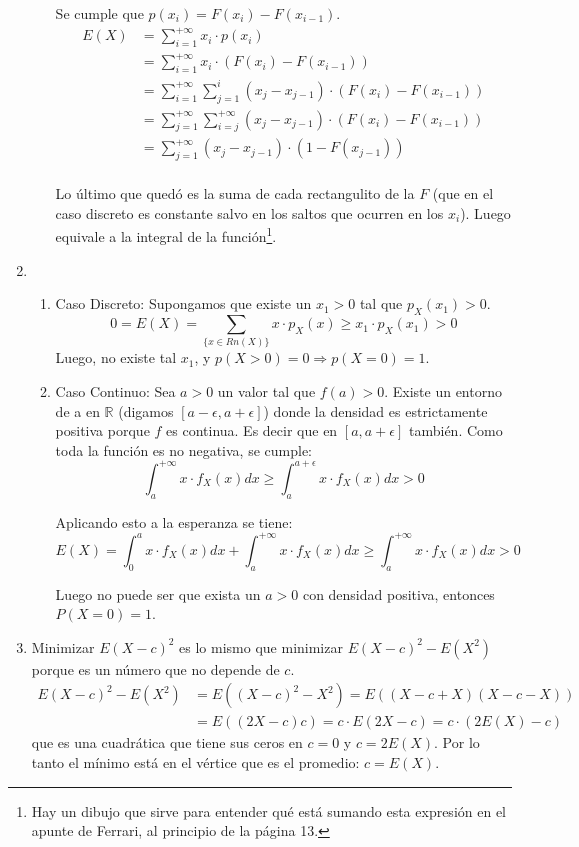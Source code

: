 \begin{enumerate}
\begin{enumerate}
				Se cumple que $p(x_i) = F(x_i) - F(x_{i-1})$.
				\begin{align*}
					E(X)	& = \sum_{i=1}^{+\infty} x_i\cdot{p(x_i)}				\\
							& = \sum_{i=1}^{+\infty} x_i\cdot(F(x_i) - F(x_{i-1}))	\\
							& = \sum_{i=1}^{+\infty} \sum_{j=1}^{i} (x_j - x_{j-1})\cdot(F(x_i) - F(x_{i-1}))		\\
							& = \sum_{j=1}^{+\infty} \sum_{i=j}^{+\infty} (x_j - x_{j-1})\cdot(F(x_i) - F(x_{i-1}))	\\
							& = \sum_{j=1}^{+\infty} (x_j - x_{j-1})\cdot(1 - F(x_{j-1}))							\\
				\end{align*}
				
				Lo último que quedó es la suma de cada rectangulito de la $F$ (que en el caso discreto es constante salvo en los saltos que ocurren en los $x_i$).
				Luego equivale a la integral de la función\footnote{Hay un dibujo que sirve para entender qué está sumando esta expresión en el apunte de Ferrari, al principio de la página 13.}.
		\end{enumerate}
		
	\item
		\begin{enumerate}
			\item Caso Discreto:
				Supongamos que existe un $x_1 > 0$ tal que $p_X(x_1) > 0$.
				$$0 = E(X) = \sum_{\{x \in Rn(X)\}} x\cdot p_X(x) \geq x_1\cdot p_X(x_1) > 0$$
				Luego, no existe tal $x_1$, y $p(X > 0) = 0 \Rightarrow p(X = 0) = 1$.
			\item Caso Continuo:
				Sea $a > 0$ un valor tal que $f(a) > 0$.
				Existe un entorno de a en $\mathbb{R}$ (digamos $[a - \epsilon, a + \epsilon]$) donde la densidad es estrictamente positiva porque $f$ es continua.
				Es decir que en $[a, a + \epsilon]$ también.
				Como toda la función es no negativa, se cumple:
				$$\int_a^{+\infty}x\cdot f_X(x)dx \geq \int_a^{a+\epsilon}x\cdot f_X(x)dx > 0$$
				
				Aplicando esto a la esperanza se tiene:
				$$E(X) = \int_0^{a}x\cdot f_X(x)dx + \int_a^{+\infty}x\cdot f_X(x)dx \geq \int_a^{+\infty}x\cdot f_X(x)dx > 0$$
				
				Luego no puede ser que exista un $a > 0$ con densidad positiva, entonces $P(X=0) = 1$.
		\end{enumerate}
		
	\item
		Minimizar $E(X-c)^2$ es lo mismo que minimizar $E(X-c)^2 - E(X^2)$ porque es un número que no depende de $c$.
		\begin{align*}
			E(X-c)^2 - E(X^2)	& = E((X-c)^2 - X^2) = E((X-c+X)(X-c-X))			\\
								& = E((2X-c)c) = c\cdot E(2X-c)	= c\cdot (2E(X)-c)
		\end{align*}
		que es una cuadrática que tiene sus ceros en $c=0$ y $c=2E(X)$. Por lo tanto el mínimo está en el vértice que es el promedio: $c=E(X)$.
		

\end{enumerate}
